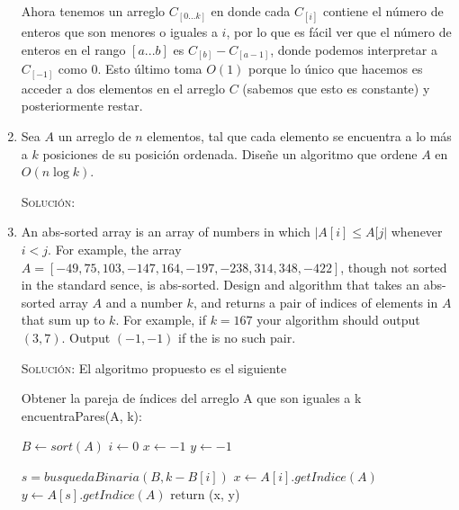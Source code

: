 \documentclass[letterpaper,11pt]{article}
\begin{document}
\begin{enumerate}
    Ahora tenemos un arreglo $C_{[0...k]}$ en donde cada $C_{[i]}$ contiene el 
    número de enteros que son menores o iguales a $i$, por lo que es fácil ver 
    que el número de enteros en el rango $[a...b]$ es $C_[b] - C_[a-1]$, donde 
    podemos interpretar a $C_{[-1]}$ como $0$. Esto último toma $O(1)$ porque 
    lo único que hacemos es acceder a dos elementos en el arreglo $C$ (sabemos 
    que esto es constante) y posteriormente restar. 

    \item Sea $A$ un arreglo de $n$ elementos, tal que cada elemento se 
    encuentra a lo más a $k$ posiciones de su posición ordenada. Diseñe un 
    algoritmo que ordene $A$ en $O(n \log k)$.

    \textsc{Solución:}

    \item An abs-sorted array is an array of numbers in which $|A[i] \leq A[j|$
    whenever $i < j$. For example, the array $A = [-49, 75, 103, -147, 164, -197,
    -238, 314, 348, -422]$, though not sorted in the standard sence, is 
    abs-sorted. Design and algorithm that takes an abs-sorted array $A$ and a 
    number $k$, and returns a pair of indices of elements in $A$ that sum up to 
    $k$. For example, if $k = 167$ your algorithm should output $(3, 7)$. Output 
    $(-1, -1)$ if the is no such pair.

    \textsc{Solución:} El algoritmo propuesto es el siguiente 
    \begin{center}
        \begin{minipage}[c]{0.75\textwidth}
        \begin{algorithm}[H]
            \caption{Obtener la pareja de índices del arreglo A que son iguales 
                     a k \\ encuentraPares(A, k):} 
            \begin{algorithmic}[1]
                \State $B \gets sort(A)$
                \State $i \gets 0$
                \State $x \gets -1$
                \State $y \gets -1$

                    \State $s = busquedaBinaria(B, k-B[i])$
                        \State $x \gets A[i].getIndice(A)$
                        \State $y \gets A[s].getIndice(A)$
                        \State return (x, y)
                    \EndIf
                \EndWhile
                
            \end{algorithmic} 
        \end{algorithm}
        \end{minipage}
    \end{center}


\end{enumerate}
\end{document}

